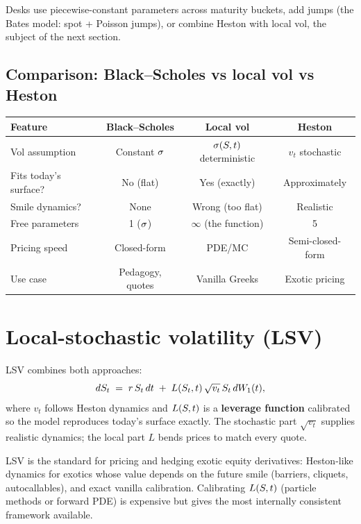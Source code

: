 \noindent
Desks use piecewise-constant parameters across maturity buckets, add
jumps (the Bates model: spot + Poisson jumps), or combine Heston with
local vol, the subject of the next section.

\subsection{Comparison: Black--Scholes vs local vol vs Heston}
\label{subsec:model_comparison}

\begin{center}
\begin{tabular}{lccc}
  \toprule
  Feature & Black--Scholes & Local vol & Heston \\
  \midrule
  Vol assumption & Constant $\sigma$ & $\sigma(S,t)$ deterministic
    & $v_t$ stochastic \\
  Fits today's surface? & No (flat) & Yes (exactly) & Approximately \\
  Smile dynamics? & None & Wrong (too flat) & Realistic \\
  Free parameters & 1 ($\sigma$) & $\infty$ (the function) & 5 \\
  Pricing speed & Closed-form & PDE/MC & Semi-closed-form \\
  Use case & Pedagogy, quotes & Vanilla Greeks & Exotic pricing \\
  \bottomrule
\end{tabular}
\end{center}


\section{Local-stochastic volatility (LSV)}
\label{sec:lsv}

LSV combines both approaches:
\begin{equation}
  dS_t
  \;=\;
  r\,S_t\,dt
  \;+\;
  L(S_t, t)\,\sqrt{v_t}\,S_t\,dW_1(t),
  \label{eq:lsv_sde}
\end{equation}
where $v_t$ follows Heston dynamics and $L(S,t)$ is a
\textbf{leverage function} calibrated so the model reproduces today's
surface exactly. The stochastic part $\sqrt{v_t}$ supplies realistic
dynamics; the local part $L$ bends prices to match every quote.

\begin{keyfactbox}
LSV is the standard for pricing and hedging exotic equity
derivatives: Heston-like dynamics for exotics whose value depends on
the future smile (barriers, cliquets, autocallables), and exact
vanilla calibration. Calibrating $L(S,t)$ (particle methods or
forward PDE) is expensive but gives the most internally consistent
framework available.
\end{keyfactbox}

